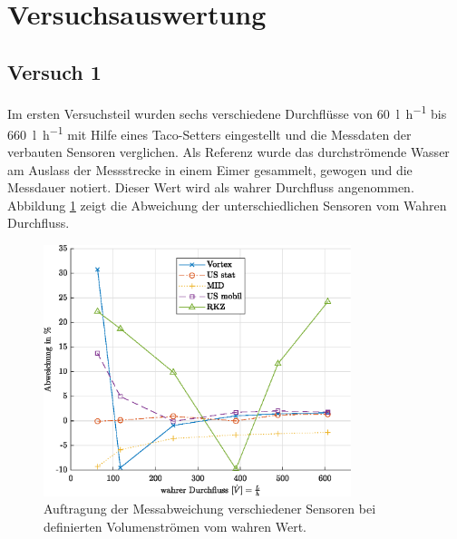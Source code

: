 \section{Versuchsauswertung}

\subsection{Versuch 1}
Im ersten Versuchsteil wurden sechs verschiedene Durchflüsse von \SI{60}{\litre\per\hour} bis \SI{660}{\litre\per\hour} mit Hilfe eines Taco-Setters eingestellt und die Messdaten der verbauten Sensoren verglichen. Als Referenz wurde das durchströmende Wasser am Auslass der Messstrecke in einem Eimer gesammelt, gewogen und die Messdauer notiert. Dieser Wert wird als wahrer Durchfluss angenommen. Abbildung \ref{fig:devPc} zeigt die Abweichung der unterschiedlichen Sensoren vom Wahren Durchfluss. 
\begin{figure}[H]
	\centering
	\includegraphics[width=0.8\textwidth]{../DATA/devPcPlot.eps}
	\caption[Messabweichung Sensoren]{Auftragung der Messabweichung verschiedener Sensoren bei definierten Volumenströmen vom wahren Wert.}
	\label{fig:devPc}
\end{figure}

